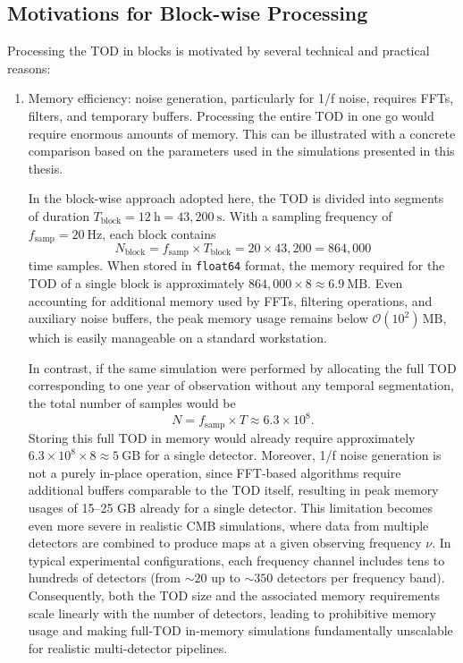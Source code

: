\subsection{Motivations for Block-wise Processing}

Processing the TOD in blocks is motivated by several technical and practical reasons:

\begin{enumerate}
    \item Memory efficiency:  
    noise generation, particularly for 1/f noise, requires FFTs, filters, and temporary buffers. Processing the entire TOD in one go would require enormous amounts of memory.
    This can be illustrated with a concrete comparison based on the parameters used in the simulations presented in this thesis.

    In the block-wise approach adopted here, the TOD is divided into segments of duration \(T_\text{block} = 12 \ \text{h} = 43{,}200 \ \text{s}\). With a sampling frequency of \(f_\text{samp} = 20 \ \text{Hz}\), each block contains
    \[
    N_\text{block} = f_\text{samp} \times T_\text{block} = 20 \times 43{,}200 = 864{,}000
    \]
    time samples. When stored in \texttt{float64} format, the memory required for the TOD of a single block is approximately \(864{,}000 \times 8 \approx 6.9 \ \text{MB}\). Even accounting for additional memory used by FFTs, filtering operations, and auxiliary noise buffers, the peak memory usage remains below \(\mathcal{O}(10^2)\,\text{MB}\), which is easily manageable on a standard workstation.

    In contrast, if the same simulation were performed by allocating the full TOD corresponding to one year of observation without any temporal segmentation, the total number of samples would be
    \[
    N = f_\text{samp} \times T \approx 6.3 \times 10^8.
    \]
    Storing this full TOD in memory would already require approximately \(6.3 \times 10^8 \times 8 \approx 5 \ \text{GB}\) for a single detector. Moreover, 1/f noise generation is not a purely in-place operation, since FFT-based algorithms require additional buffers comparable to the TOD itself, resulting in peak memory usages of 15–25 GB already for a single detector.
    This limitation becomes even more severe in realistic CMB simulations, where data from multiple detectors are combined to produce maps at a given observing frequency $\nu$. In typical experimental configurations, each frequency channel includes tens to hundreds of detectors (from $\sim 20$ up to $\sim 350$ detectors per frequency band). Consequently, both the TOD size and the associated memory requirements scale linearly with the number of detectors, leading to prohibitive memory usage and making full-TOD in-memory simulations fundamentally unscalable for realistic multi-detector pipelines.


\end{enumerate}
